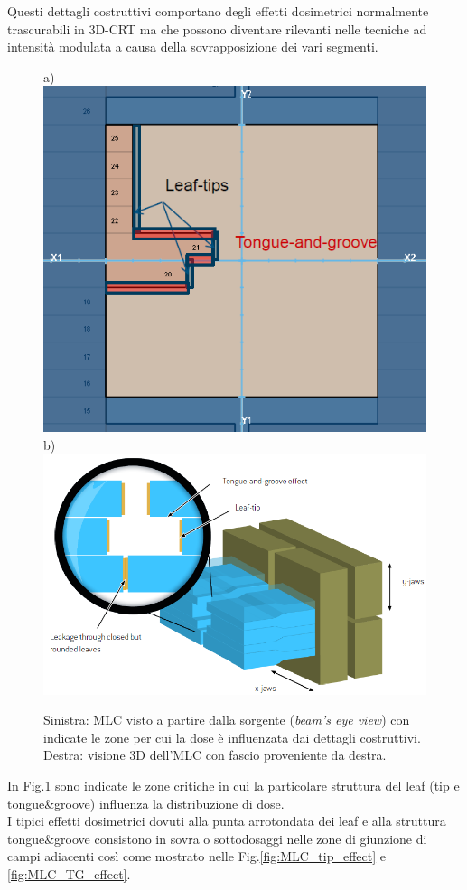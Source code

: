 Questi dettagli costruttivi comportano degli effetti dosimetrici normalmente trascurabili in 3D-CRT ma che possono diventare rilevanti nelle tecniche ad intensità modulata a causa della sovrapposizione dei vari segmenti.
\begin{figure}[!t]
\centering
a)\includegraphics[width=.35\textwidth]{./cap2/MLC_tip-tg.png}
b)\includegraphics[width=.5\textwidth]{./cap2/MLC_tip-tg_3D.png}
\caption{Sinistra: MLC visto a partire dalla sorgente (\textit{beam's eye view}) con indicate le zone per cui la dose è influenzata dai dettagli costruttivi. Destra: visione 3D dell'MLC con fascio proveniente da destra.}
\label{fig:MLC_Regions}
\end{figure}
In Fig.\ref{fig:MLC_Regions} sono indicate le zone critiche in cui la particolare struttura del leaf (tip e tongue\&{}groove) influenza la distribuzione di dose.\\
I tipici effetti dosimetrici dovuti alla punta arrotondata dei leaf e alla struttura tongue\&{}groove consistono in sovra o sottodosaggi nelle zone di giunzione di campi adiacenti così come mostrato nelle Fig.\ref{fig:MLC_tip_effect} e \ref{fig:MLC_TG_effect}.
